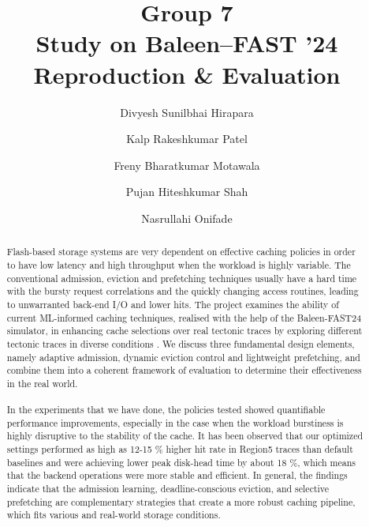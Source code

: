 \documentclass[sigconf]{acmart}
\title{Group 7\\Study on Baleen–FAST ’24 Reproduction & Evaluation}
\author{Divyesh Sunilbhai Hirapara}
\affiliation{ \institution{Fairleigh Dickinson University} \city{Vancouver} \country{Canada} }
\author{Kalp Rakeshkumar Patel}
\affiliation{ \institution{Fairleigh Dickinson University} \city{Vancouver} \country{Canada} }
\author{Freny Bharatkumar Motawala}
\affiliation{ \institution{Fairleigh Dickinson University} \city{Vancouver} \country{Canada} }
\author{Pujan Hiteshkumar Shah}
\affiliation{ \institution{Fairleigh Dickinson University} \city{Vancouver} \country{Canada} }
\author{Nasrullahi Onifade}
\affiliation{ \institution{Fairleigh Dickinson University} \city{Vancouver} \country{Canada} }
\begin{document}
{\begin{abstract}
\large Flash-based storage systems are very dependent on effective caching policies in order to have low latency and high throughput when the workload is highly variable. The conventional admission, eviction and prefetching techniques usually have a hard time with the bursty request correlations and the quickly changing access routines, leading to unwarranted back-end I/O and lower hits. The project examines the ability of current ML-informed caching techniques, realised with the help of the Baleen-FAST24 simulator, in enhancing cache selections over real tectonic traces by exploring different tectonic traces in diverse conditions \cite{baleen_artifact}. We discuss three fundamental design elements, namely adaptive admission, dynamic eviction control and lightweight prefetching, and combine them into a coherent framework of evaluation to determine their effectiveness in the real world.\\
\\In the experiments that we have done, the policies tested showed quantifiable performance improvements, especially in the case when the workload burstiness is highly disruptive to the stability of the cache. It has been observed that our optimized settings performed as high as 12-15 \% higher hit rate in Region5 traces than default baselines and were achieving lower peak disk-head time by about 18 \%, which means that the backend operations were more stable and efficient. In general, the findings indicate that the admission learning, deadline-conscious eviction, and selective prefetching are complementary strategies that create a more robust caching pipeline, which fits various and real-world storage conditions.\\
\end{abstract}

\maketitle
\fancyhead{} \fancyfoot[C]{\thepage}

\clearpage
}
\end{document}
